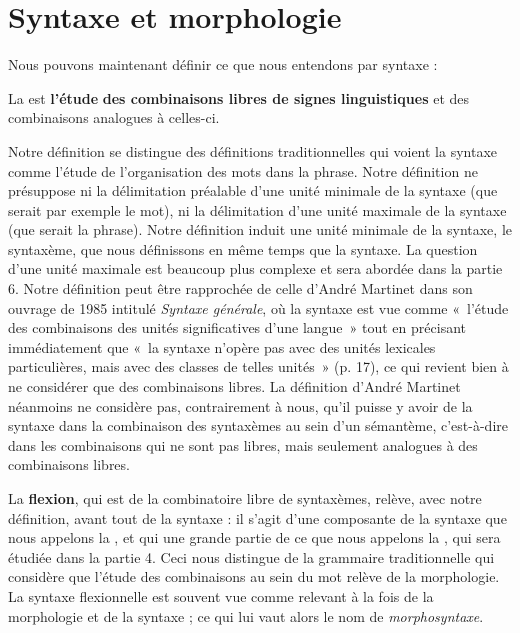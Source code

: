 \section{Syntaxe et morphologie}\label{sec:3.1.6}

Nous pouvons maintenant définir ce que nous entendons par syntaxe :

\begin{styleLivreImportant}
La  est \textbf{l’étude} \textbf{des combinaisons libres de signes linguistiques} et des combinaisons analogues à celles-ci.
\end{styleLivreImportant}

Notre définition se distingue des définitions traditionnelles qui voient la syntaxe comme l’étude de l’organisation des mots dans la phrase. Notre définition ne présuppose ni la délimitation préalable d’une unité minimale de la syntaxe (que serait par exemple le mot), ni la délimitation d’une unité maximale de la syntaxe (que serait la phrase). Notre définition induit une unité minimale de la syntaxe, le syntaxème, que nous définissons en même temps que la syntaxe. La question d’une unité maximale est beaucoup plus complexe et sera abordée dans la partie 6. Notre définition peut être rapprochée de celle d’André Martinet dans son ouvrage de 1985 intitulé \textit{Syntaxe générale}, où la syntaxe est vue comme «~l’étude des combinaisons des unités significatives d’une langue~» tout en précisant immédiatement que «~la syntaxe n’opère pas avec des unités lexicales particulières, mais avec des classes de telles unités~» (p. 17), ce qui revient bien à ne considérer que des combinaisons libres. La définition d’André Martinet néanmoins ne considère pas, contrairement à nous, qu’il puisse y avoir de la syntaxe dans la combinaison des syntaxèmes au sein d’un sémantème, c’est-à-dire dans les combinaisons qui ne sont pas libres, mais seulement analogues à des combinaisons libres.

La \textbf{flexion}, qui est de la combinatoire libre de syntaxèmes, relève, avec notre définition, avant tout de la syntaxe : il s’agit d’une composante de la syntaxe que nous appelons la , et qui une grande partie de ce que nous appelons la , qui sera étudiée dans la partie 4. Ceci nous distingue de la grammaire traditionnelle qui considère que l’étude des combinaisons au sein du mot relève de la morphologie. La syntaxe flexionnelle est souvent vue comme relevant à la fois de la morphologie et de la syntaxe ; ce qui lui vaut alors le nom de \textit{morphosyntaxe}.

